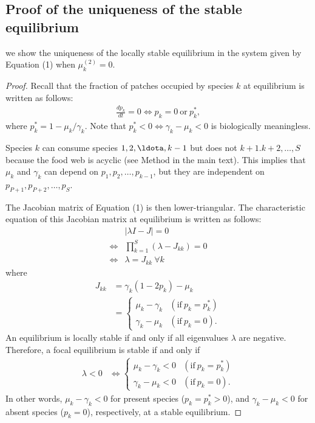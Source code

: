 \documentclass[11pt, class=article, crop=false]{standalone}
\begin{document}
\subsection{Proof of the uniqueness of the stable equilibrium}
 we show the uniqueness of the locally stable equilibrium in the system given by Equation (1) when $\mu_k^{(2)}=0$.
\begin{proof}
    Recall that the fraction of patches occupied by species $k$ at equilibrium is written as follows:
    \begin{align}
    \frac{dp_k}{dt} = 0 \Leftrightarrow p_k = 
         0 ~\text{or}~
         p_{k}^{*},
\end{align}
where $p_{k}^{*} = 1 - \mu_k / \gamma_k$. Note that $p_{k}^{*} <0 \Leftrightarrow \gamma_k-\mu_k<0$ is biologically meaningless.

Species $k$ can consume species $1,2,\ldota, k-1$ but  does not $k+1. k+2, \ldots, S$ because the food web is acyclic (see Method in the main text). This implies that $\mu_k$ and $\gamma_k$ can depend on $p_1, p_2, \ldots, p_{k-1}$, but they are independent on  $p_{P+1}, p_{P+2}, \ldots, p_{S}$.
    
    The Jacobian matrix of Equation (1) is then lower-triangular. The characteristic equation of this Jacobian matrix at equilibrium  is written as follows:
    \begin{align}
         &|\lambda I - J| = 0  \nonumber\\
        \Leftrightarrow 
        &\prod_{k=1}^{S}(\lambda -J_{kk})=0 \nonumber\\
        \Leftrightarrow
        &\lambda = J_{kk}~ \forall k
    \end{align}
    where
    \begin{align}
        J_{kk} &= \gamma_k(1-2p_k)-\mu_k \\
        &=\left\{
        \begin{array}{cl}
             \mu_k - \gamma_k& (\text{if}~ p_k=p_k^*)   \\
             \gamma_k - \mu_k& (\text{if}~ p_k=0) .
        \end{array}
        \right.
    \end{align}
An equilibrium is locally stable if and only if all eigenvalues $\lambda$ are negative. Therefore, a focal equilibrium is stable if and only if
\begin{align}
    \lambda < 0 &\Leftrightarrow 
    \left\{
    \begin{array}{cc}
         \mu_k-\gamma_k<0&  (\text{if}~ p_k=p_k^*)   \\
         \gamma_k-\mu_k<0& (\text{if}~ p_k=0) .
    \end{array}
    \right.
\end{align}
In other words, $\mu_k-\gamma_k<0$ for present species ($p_k=p_k^*>0$), and $\gamma_k-\mu_k<0$ for absent species ($p_k=0$), respectively, at a stable equilibrium.


\end{proof}
\end{document}
